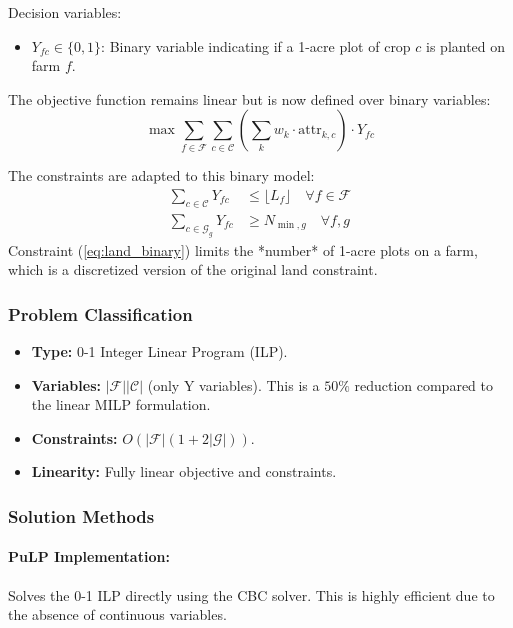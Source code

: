 \documentclass[11pt,a4paper]{article}
\begin{document}
Decision variables:
\begin{itemize}
    \item $Y_{fc} \in \{0,1\}$: Binary variable indicating if a 1-acre plot of crop $c$ is planted on farm $f$.
\end{itemize}

The objective function remains linear but is now defined over binary variables:
\begin{equation}
\max \sum_{f \in \mathcal{F}} \sum_{c \in \mathcal{C}} \left(\sum_{k} w_k \cdot \text{attr}_{k,c}\right) \cdot Y_{fc}
\label{eq:bqubo_obj}
\end{equation}

The constraints are adapted to this binary model:
\begin{align}
\sum_{c \in \mathcal{C}} Y_{fc} &\leq \lfloor L_f \rfloor \quad \forall f \in \mathcal{F} \label{eq:land_binary}\\
\sum_{c \in \mathcal{G}_g} Y_{fc} &\geq N_{\min,g} \quad \forall f,g \label{eq:diversity_binary}
\end{align}
Constraint (\ref{eq:land_binary}) limits the *number* of 1-acre plots on a farm, which is a discretized version of the original land constraint.

\subsubsection{Problem Classification}
\begin{itemize}
    \item \textbf{Type:} 0-1 Integer Linear Program (ILP).
    \item \textbf{Variables:} $|\mathcal{F}||\mathcal{C}|$ (only Y variables). This is a $50\%$ reduction compared to the linear MILP formulation.
    \item \textbf{Constraints:} $O(|\mathcal{F}|(1 + 2|\mathcal{G}|))$.
    \item \textbf{Linearity:} Fully linear objective and constraints.
\end{itemize}

\subsubsection{Solution Methods}

\paragraph{PuLP Implementation:}
Solves the 0-1 ILP directly using the CBC solver. This is highly efficient due to the absence of continuous variables.
\end{document}
